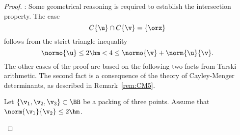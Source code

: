 \begin{proof}
: Some geometrical reasoning is required to
establish the intersection property.  The case
\begin{displaymath}
C\{\u\}\cap C\{\v\} = \{\orz\}
\end{displaymath}
follows from the strict triangle inequality 
\begin{displaymath}
\normo{\u} \le 2\hm < 4 \le \normo{\v} + \norm{\u}{\v}.
\end{displaymath}
The other cases of the proof are based on the following two facts from
Tarski arithmetic.  The second fact is a consequence of the theory of
Cayley-Menger determinants, as described in Remark~\ref{rem:CM5}.
\begin{description}
\item {} Let $\{\v_1,\v_2,\v_3\}\subset \BB$ be a
  packing of three points.  Assume that $\norm{\v_1}{\v_2}\le 2\hm$.

\end{description}
\end{proof}
